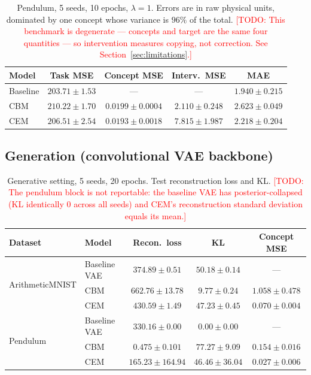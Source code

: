 \documentclass[11pt]{article}
\newcommand{\todo}[1]{\textcolor{red}{[TODO: #1]}}
\begin{document}
\begin{table}[h]
\centering
\caption{Pendulum, 5 seeds, 10 epochs, $\lambda = 1$. Errors are in raw
physical units, dominated by one concept whose variance is $96\%$ of the total.
\todo{This benchmark is degenerate --- concepts and target are the same four
quantities --- so intervention measures copying, not correction. See
Section~\ref{sec:limitations}.}}
\label{tab:app-pendulum}
\begin{tabular}{lcccc}
\toprule
\textbf{Model} & \textbf{Task MSE} & \textbf{Concept MSE} &
\textbf{Interv.\ MSE} & \textbf{MAE} \\
\midrule
Baseline & $\mathbf{203.71 \pm 1.53}$ & --- & --- & $\mathbf{1.940 \pm 0.215}$ \\
CBM      & $210.22 \pm 1.70$ & $0.0199 \pm 0.0004$ & $\mathbf{2.110 \pm 0.248}$ & $2.623 \pm 0.049$ \\
CEM      & $206.51 \pm 2.54$ & $\mathbf{0.0193 \pm 0.0018}$ & $7.815 \pm 1.987$ & $2.218 \pm 0.204$ \\
\bottomrule
\end{tabular}
\end{table}

\subsection{Generation (convolutional VAE backbone)}

\begin{table}[h]
\centering
\caption{Generative setting, 5 seeds, 20 epochs. Test reconstruction loss and
KL. \todo{The pendulum block is not reportable: the baseline VAE has
posterior-collapsed (KL identically $0$ across all seeds) and CEM's
reconstruction standard deviation equals its mean.}}
\label{tab:app-gen}
\begin{tabular}{llccc}
\toprule
\textbf{Dataset} & \textbf{Model} & \textbf{Recon.\ loss} & \textbf{KL} &
\textbf{Concept MSE} \\
\midrule
\multirow{3}{*}{ArithmeticMNIST}
 & Baseline VAE & $\mathbf{374.89 \pm 0.51}$ & $50.18 \pm 0.14$ & --- \\
 & CBM          & $662.76 \pm 13.78$ & $9.77 \pm 0.24$ & $1.058 \pm 0.478$ \\
 & CEM          & $430.59 \pm 1.49$ & $47.23 \pm 0.45$ & $\mathbf{0.070 \pm 0.004}$ \\
\midrule
\multirow{3}{*}{Pendulum}
 & Baseline VAE & $330.16 \pm 0.00$ & $0.00 \pm 0.00$ & --- \\
 & CBM          & $0.475 \pm 0.101$ & $77.27 \pm 9.09$ & $0.154 \pm 0.016$ \\
 & CEM          & $165.23 \pm 164.94$ & $46.46 \pm 36.04$ & $\mathbf{0.027 \pm 0.006}$ \\
\bottomrule
\end{tabular}
\end{table}
\end{document}
